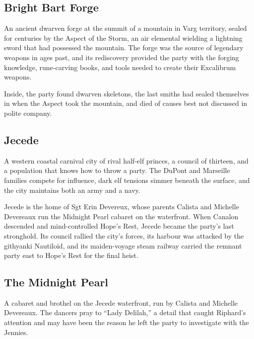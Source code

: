 \smallskip

\subsection*{Bright Bart Forge}

An ancient dwarven forge at the summit of a mountain in Varg territory, sealed for centuries by the Aspect of the Storm, an air elemental wielding a lightning sword that had possessed the mountain.  The forge was the source of legendary weapons in ages past, and its rediscovery provided the party with the forging knowledge, rune-carving books, and tools needed to create their Excalibrum weapons.

Inside, the party found dwarven skeletons, the last smiths had sealed themselves in when the Aspect took the mountain, and died of causes best not discussed in polite company.

\smallskip

\subsection*{Jecede}

A western coastal carnival city of rival half-elf princes, a council of thirteen, and a population that knows how to throw a party.  The DuPont and Marseille families compete for influence, dark elf tensions simmer beneath the surface, and the city maintains both an army and a navy.

Jecede is the home of Sgt Erin Devereux, whose parents Calista and Michelle Devereaux run the Midnight Pearl cabaret on the waterfront.  When Canalon descended and mind-controlled Hope's Rest, Jecede became the party's last stronghold.  Its council rallied the city's forces, its harbour was attacked by the githyanki Nautiloid, and its maiden-voyage steam railway carried the remnant party east to Hope's Rest for the final heist.

\smallskip

\subsection*{The Midnight Pearl}

A cabaret and brothel on the Jecede waterfront, run by Calista and Michelle Devereaux.  The dancers pray to ``Lady Delilah,'' a detail that caught Riphard's attention and may have been the reason he left the party to investigate with the Jennies.

\smallskip

